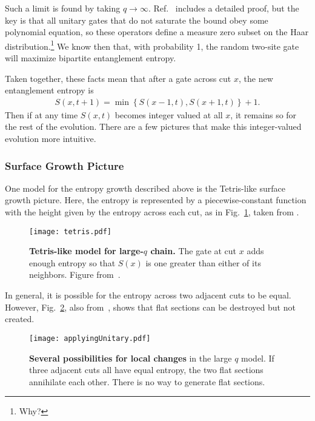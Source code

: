 Such a limit is found by taking $q\to\infty$. Ref.~\cite{Nahum2017} includes a detailed proof, but the key is that all unitary gates that do not saturate the bound obey some polynomial equation, so these operators define a measure zero subset on the Haar distribution.\footnote{Why?} We know then that, with probability 1, the random two-site gate will maximize bipartite entanglement entropy.

Taken together, these facts mean that after a gate across cut $x$, the new entanglement entropy is
\begin{align}
S(x, t+1) = \min\left\lbrace S(x-1, t), S(x+1, t)\right\rbrace + 1.
	\label{eqn:update}
\end{align}
Then if at any time $S(x,t)$ becomes integer valued at all $x$, it remains so for the rest of the evolution. There are a few pictures that make this integer-valued evolution more intuitive.

\subsubsection{Surface Growth Picture}  \label{subsub:surfgrowth}

One model for the entropy growth described above is the Tetris-like surface growth picture. Here, the entropy is represented by a piecewise-constant function with the height given by the entropy across each cut, as in Fig.~\ref{fig:tetris}, taken from \cite{Nahum2017}. 
\begin{figure}
	\centering
	\texttt{[image: tetris.pdf]}
	\caption{\textbf{Tetris-like model for large-$q$ chain.} The gate at cut $x$ adds enough entropy so that $S(x)$ is one greater than either of its neighbors. Figure from~\cite{Nahum2017}.}
	\label{fig:tetris}
\end{figure}
In general, it is possible for the entropy across two adjacent cuts to be equal. However, Fig.~\ref{fig:applyingUnitary}, also from~\cite{Nahum2017}, shows that flat sections can be destroyed but not created. 
\begin{figure}
	\centering
	\texttt{[image: applyingUnitary.pdf]}
	\caption{\textbf{Several possibilities for local changes} in the large $q$ model. If three adjacent cuts all have equal entropy, the two flat sections annihilate each other. There is no way to generate flat sections.}
	\label{fig:applyingUnitary}
\end{figure}

